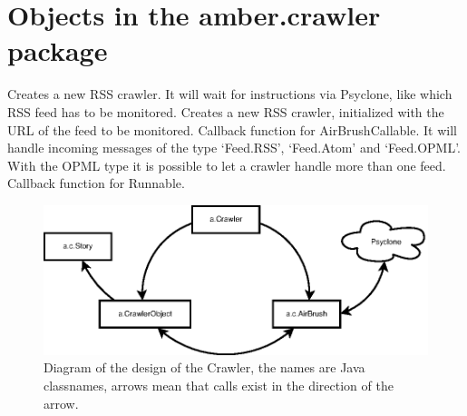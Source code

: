 \section{Objects in the amber.crawler package}




\begin{classmetadata}
\end{classmetadata}

\begin{interface}
    {Creates a new RSS crawler. It will wait for instructions via Psyclone,
      like which RSS feed has to be monitored.}
    {Creates a new RSS crawler, initialized with the URL of the feed to be
      monitored.}
    {Callback function for AirBrushCallable. It will handle incoming messages
        of the type `Feed.RSS', `Feed.Atom' and `Feed.OPML'. With the OPML type
        it is possible to let a crawler handle more than one feed.}
    {Callback function for Runnable.}
\end{interface}

\begin{figure}
  \centering
  \includegraphics{image/crawler}
  \caption{
    Diagram of the design of the Crawler, the names are Java classnames, arrows
    mean that calls exist in the direction of the arrow.
  }
\end{figure}


